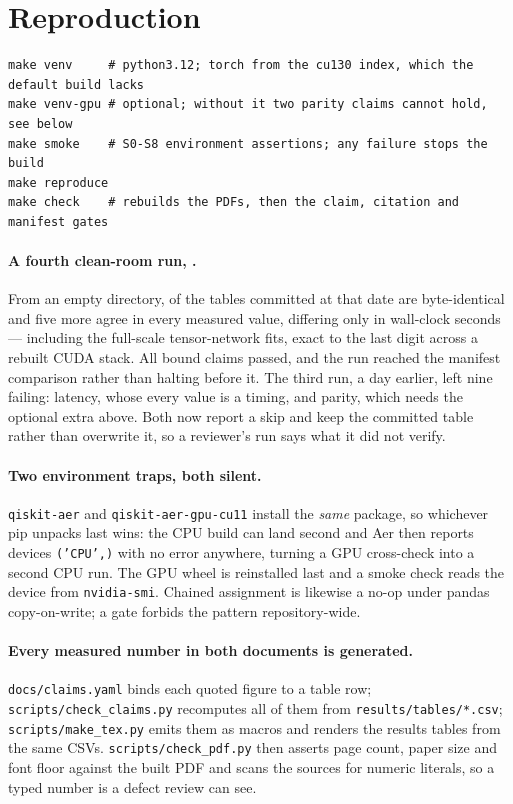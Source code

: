 \section{Reproduction}

\begin{verbatim}
make venv     # python3.12; torch from the cu130 index, which the default build lacks
make venv-gpu # optional; without it two parity claims cannot hold, see below
make smoke    # S0-S8 environment assertions; any failure stops the build
make reproduce
make check    # rebuilds the PDFs, then the claim, citation and manifest gates
\end{verbatim}

\paragraph{A fourth clean-room run, .} From an empty directory,
 of the  tables committed at that date are byte-identical and five more
agree in every measured value, differing only in wall-clock seconds --- including the
full-scale tensor-network fits, exact to the last digit across a rebuilt CUDA stack. All
 bound claims passed, and the run reached the manifest comparison rather than
halting before it. The third run, a day earlier, left nine failing: latency, whose every value
is a timing, and parity, which needs the optional extra above. Both now report a skip and keep
the committed table rather than overwrite it, so a reviewer's run says what it did not verify.

\paragraph{Two environment traps, both silent.} \texttt{qiskit-aer} and
\texttt{qiskit-aer-gpu-cu11} install the \emph{same} package, so whichever pip unpacks last
wins: the CPU build can land second and Aer then reports devices \texttt{('CPU',)} with no
error anywhere, turning a GPU cross-check into a second CPU run. The GPU wheel is reinstalled
last and a smoke check reads the device from \texttt{nvidia-smi}. Chained assignment is
likewise a no-op under pandas copy-on-write; a gate forbids the pattern repository-wide.

\paragraph{Every measured number in both documents is generated.} \texttt{docs/claims.yaml} binds each
quoted figure to a table row; \texttt{scripts/check\_claims.py} recomputes all of them from
\texttt{results/tables/*.csv}; \texttt{scripts/make\_tex.py} emits them as macros and renders
the results tables from the same CSVs. \texttt{scripts/check\_pdf.py} then asserts page count,
paper size and font floor against the built PDF and scans the sources for numeric literals, so
a typed number is a defect review can see.

